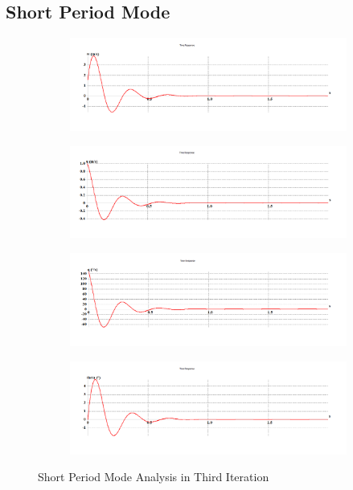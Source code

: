 \subsection{Short Period Mode}
\begin{figure}[H]
\begin{subfigure}{0.48\textwidth}
\includegraphics[width = \linewidth]{w (2).png}
\end{subfigure}
\begin{subfigure}{0.48\textwidth}
\includegraphics[width = \linewidth]{u (2).png}
\end{subfigure}
\medskip
\begin{subfigure}{0.48\textwidth}
\includegraphics[width = \linewidth]{q (2).png}
\end{subfigure}
\begin{subfigure}{0.48\textwidth}
\includegraphics[width = \linewidth]{theta (2).png}
\end{subfigure}
\caption{Short Period Mode Analysis in Third Iteration}
\end{figure}
